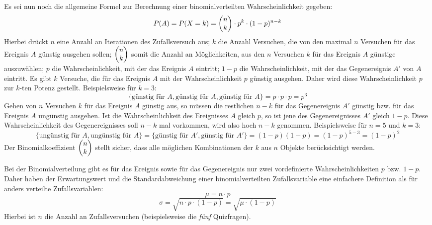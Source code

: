 Es sei nun noch die allgemeine Formel zur Berechnung einer binomialverteilten Wahrscheinlichkeit gegeben: $$P(A) = P(X=k) = \begin{pmatrix}n \\ k\end{pmatrix} \cdot p^k \cdot (1-p)^{n-k}$$ Hierbei dr\"{u}ckt $n$ eine Anzahl an Iterationen des Zufallsversuch aus; $k$ die Anzahl Versuchen, die von den maximal $n$ Versuchen f\"{u}r das Ereignis $A$ g\"{u}nstig ausgehen sollen; $\begin{pmatrix}n \\ k\end{pmatrix}$ somit die Anzahl an M\"{o}glichkeiten, aus den $n$ Versuchen $k$ f\"{u}r das Ereignis $A$ g\"{u}nstige auszuw\"{a}hlen; $p$ die Wahrscheinlichkeit, mit der das Ereignis $A$ eintritt; $1-p$ die Wahrscheinlichkeit, mit der das Gegenereignis $A'$ von $A$ eintritt. Es gibt $k$ Versuche, die f\"{u}r das Ereignis $A$ mit der Wahrscheinlichkeit $p$ g\"{u}nstig ausgehen. Daher wird diese Wahrscheinlichkeit $p$ zur $k$-ten Potenz gestellt. Beispielsweise f\"{u}r $k=3$: $$\{\text{g\"{u}nstig f\"{u}r } A, \text{g\"{u}nstig f\"{u}r } A, \text{g\"{u}nstig f\"{u}r } A\} = p \cdot p \cdot p = p^3$$ Gehen von $n$ Versuchen $k$ f\"{u}r das Ereignis $A$ g\"{u}nstig aus, so m\"{u}ssen die restlichen $n-k$ f\"{u}r das Gegenereignis $A'$ g\"{u}nstig bzw. f\"{u}r das Ereignis $A$ ung\"{u}nstig ausgehen. Ist die Wahrscheinlichkeit des Ereignisses $A$ gleich $p$, so ist jene des Gegenereignisses $A'$ gleich $1 - p$. Diese Wahrscheinlichkeit des Gegenereignisses soll $n-k$ mal vorkommen, wird also hoch $n-k$ genommen. Beispielsweise f\"{u}r $n=5$ und $k=3$: $$\{\text{ung\"{u}nstig f\"{u}r } A, \text{ung\"{u}nstig f\"{u}r } A\} = \{\text{g\"{u}nstig f\"{u}r } A', \text{g\"{u}nstig f\"{u}r } A'\} = (1-p) (1-p) = (1-p)^{5-3} = (1-p)^2$$ Der Binomialkoeffizient $\begin{pmatrix}n \\ k\end{pmatrix}$ stellt sicher, dass alle m\"{o}glichen Kombinationen der $k$ aus $n$ Objekte ber\"{u}cksichtigt werden.

Bei der Binomialverteilung gibt es f\"{u}r das Ereignis sowie f\"{u}r das Gegenereignis nur zwei vordefinierte Wahrscheinlichkeiten $p$ bzw. $1 - p$. Daher haben der Erwartungswert und die Standardabweichung einer binomialverteilten Zufallsvariable eine einfachere Definition als f\"{u}r anders verteilte Zufallsvariablen: $$\mu = n \cdot p$$ $$\sigma = \sqrt{n \cdot p \cdot (1-p)} = \sqrt{\mu \cdot (1 - p)}$$ Hierbei ist $n$ die Anzahl an Zufallsversuchen (beispielsweise die \emph{f\"{u}nf} Quizfragen).

